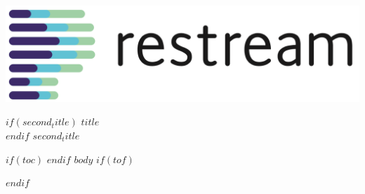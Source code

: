 \documentclass[a4paper,11pt]{article}
\makeatletter
\def\maxwidth{\ifdim\Gin@nat@width>1\linewidth
1\linewidth
\else\Gin@nat@width\fi}
\let\oldincludegraphics\includegraphics %
\renewcommand\includegraphics[2][]{%
  \vspace{8mm}
  \centerline{
  \oldincludegraphics[width=\maxwidth]{#2}
  }
}
\let\zz\[\let\zzz\] %
\let\[\zz\let\]\zzz
\makeatother
\begin{document}
\sloppy %

\begin{titlepage}
    \includegraphics[scale=0.15]{restream_logo.png}
    \vspace*{\fill}
    \vspace{-5cm}
    $if(second_title)$
      \textsc{\fontsize{31}{34}\headingfont\RaggedRight\nohyphens{$title$}}\\[0.5cm]
    $endif$
    \fontsize{30}{30}\headingfontlight\RaggedRight\nohyphens{$second_title$}\\
    \vfill
    \thispagestyle{titlefooter}
\end{titlepage}

$if(toc)$
  \tableofcontents
  \newpage
$endif$
$body$
$if(tof)$
  \newpage
  \listoffigures
$endif$
\end{document}

